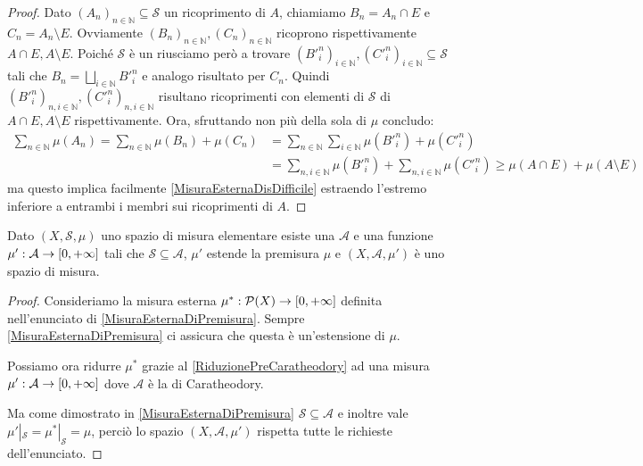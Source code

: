 \begin{proof}
	Dato $(A_n)_{n\in\mathbb N}\subseteq\mathcal S$ un ricoprimento di $A$, chiamiamo $B_n=A_n\cap E$ e $C_n=A_n\setminus E$. Ovviamente $(B_n)_{n\in\mathbb N},(C_n)_{n\in\mathbb N}$ ricoprono rispettivamente $A\cap E,A\setminus E$. Poiché $\mathcal S$ è un \semiring{} riusciamo però a trovare $(B'^n_i)_{i\in\mathbb N},(C'^n_i)_{i\in\mathbb N} \subseteq \mathcal S$ tali che $B_n=\bigsqcup_{i\in\mathbb N}B'^n_i$ e analogo risultato per $C_n$. Quindi $(B'^n_i)_{n,i\in\mathbb N}, (C'^n_i)_{n,i\in\mathbb N}$ risultano ricoprimenti con elementi di $\mathcal S$ di $A\cap E,A\setminus E$ rispettivamente.
	Ora, sfruttando non più della sola \sigadd[ità] di $\mu$ concludo:
	\begin{align*}
		\sum_{n\in\mathbb N}\mu(A_n)=\sum_{n\in\mathbb N} \mu(B_n)+\mu(C_n)&=
		\sum_{n\in\mathbb N}\sum_{i\in\mathbb N}\mu(B'^n_i)+\mu(C'^n_i)\\
		&=
		\sum_{n,i\in\mathbb N}\mu(B'^n_i)+\sum_{n,i\in\mathbb N}\mu(C'^n_i)\ge \mu(A\cap E)+\mu(A\setminus E)
	\end{align*}
	ma questo implica facilmente \cref{MisuraEsternaDisDifficile} estraendo l'estremo inferiore a entrambi i membri sui ricoprimenti di $A$.
\end{proof}

\begin{theorem}\label{EstensionexCaratheodory}
	Dato $(X,\mathcal S,\mu)$ uno spazio di misura elementare esiste una \sigalg{} $\mathcal A$ e una funzione $\mu':\mathcal A\to[0,+\infty]$ tali che $\mathcal S\subseteq \mathcal A$, $\mu'$ estende la premisura $\mu$ e $(X,\mathcal A,\mu')$ è uno spazio di misura.
\end{theorem}
\begin{proof}
	Consideriamo la misura esterna $\mu^*:\mathcal P(X)\to[0,+\infty]$ definita nell'enunciato di \cref{MisuraEsternaDiPremisura}. Sempre \cref{MisuraEsternaDiPremisura} ci assicura che questa è un'estensione di $\mu$.
	
	Possiamo ora ridurre $\mu^*$ grazie al \cref{RiduzionePreCaratheodory} ad una misura $\mu':\mathcal A\to[0,+\infty]$ dove $\mathcal A$ è la \sigalg{} di Caratheodory. 
	
	Ma come dimostrato in \cref{MisuraEsternaDiPremisura} $\mathcal S\subseteq\mathcal A$ e inoltre vale $\mu'|_{\mathcal S}=\mu^*|_{\mathcal S}=\mu$, perciò lo spazio $(X,\mathcal A,\mu')$ rispetta tutte le richieste dell'enunciato.
\end{proof}
